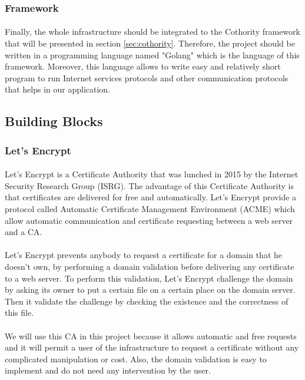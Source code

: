 \documentclass[11pt, a4paper, twoside, openright]{article}
\begin{document}
\subsubsection{Framework}
\paragraph{}Finally, the whole infrastructure should be integrated to the Cothority framework that will be presented in section \ref{sec:cothority}. Therefore, the project should be written in a programming language named "Golang" which is the language of this framework. Moreover, this language allows to write easy and relatively short program to run Internet services protocols and other communication protocols that helps in our application.  
\subsection{Building Blocks}
\subsubsection{Let's Encrypt}
\paragraph{} Let's Encrypt is a Certificate Authority that was lunched in 2015 by the Internet Security Research Group (ISRG). The advantage of this Certificate Authority is that certificates are delivered for free and automatically. Let's Encrypt provide a protocol called Automatic Certificate Management Environment (ACME) which allow automatic communication and certificate requesting between a web server and a CA.
\paragraph{}
Let's Encrypt prevents anybody to request a certificate for a domain that he doesn't own, by performing a domain validation before delivering any certificate to a web server. To perform this validation, Let's Encrypt challenge the domain by asking its owner to put a certain file on a certain place on the domain server. Then it validate the challenge by checking the existence and the correctness of this file.
\paragraph{}
We will use this CA in this project because it allows automatic and free requests and it will permit a user of the infrastructure to request a certificate without any complicated manipulation or cost. Also, the domain validation is easy to implement and do not need any intervention by the user.
\end{document}

